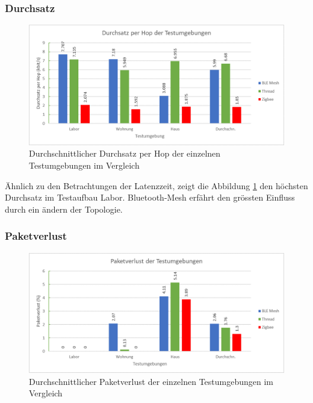 \subsubsection{Durchsatz}\label{subsec:VergleichDurchsatzTestumgebungen}


\begin{figure}[h]
	\centering
	\includegraphics[width=1.0\textwidth]{graphics/Durchsatz_per_Hop_Testumgebungen.png}
	\caption{Durchschnittlicher Durchsatz per Hop der einzelnen Testumgebungen im Vergleich}\label{fig:Durchsätze_per_Hop_Testumgebungen}
\end{figure}

Ähnlich zu den Betrachtungen der Latenzzeit, zeigt die Abbildung \ref{fig:Durchsätze_per_Hop_Testumgebungen} den höchsten Durchsatz im Testaufbau Labor. Bluetooth-Mesh erfährt den grössten Einfluss durch ein ändern der Topologie. 

\subsubsection{Paketverlust}\label{subsec:VergleichPaketverlustTestumgebungen}


\begin{figure}[h]
	\centering
	\includegraphics[width=1.0\textwidth]{graphics/Paketverlust_Testumgebungen.png}
	\caption{Durchschnittlicher Paketverlust der einzelnen Testumgebungen im Vergleich}\label{fig:PaketverlusteTestumgebungen}
\end{figure}


